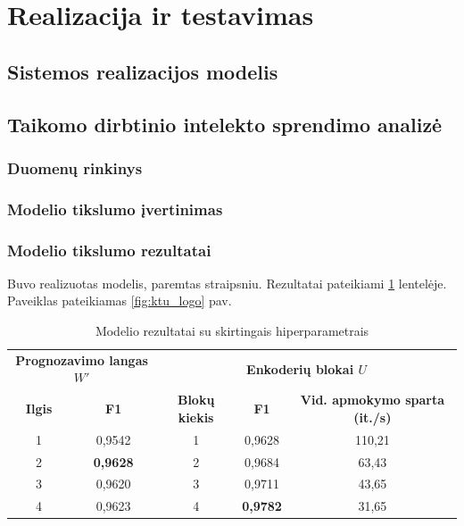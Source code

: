 \section{Realizacija ir testavimas}
\subsection{Sistemos realizacijos modelis}
\subsection{Taikomo dirbtinio intelekto sprendimo analizė}
\subsubsection{Duomenų rinkinys}
\subsubsection{Modelio tikslumo įvertinimas}
\subsubsection{Modelio tikslumo rezultatai}
Buvo realizuotas modelis, paremtas \cite{attpaper} straipsniu. Rezultatai pateikiami \ref{tab:findparam} lentelėje.
Paveiklas pateikiamas \ref{fig:ktu_logo} pav.
\begin{table}[H]
\caption{Modelio rezultatai su skirtingais hiperparametrais}
\centering
\begin{tabular}{ccccc}
\toprule
\multicolumn{2}{c}{\textbf{Prognozavimo langas $W'$}} & \multicolumn{3}{c}{\textbf{Enkoderių blokai $U$}} \\
\cmidrule(lr){1-2} \cmidrule(lr){3-5}
\textbf{Ilgis} & \textbf{F1} & \textbf{Blokų kiekis} & \textbf{F1} & \textbf{Vid. apmokymo sparta (it./s)} \\
\midrule
1 & 0,9542 & 1 & 0,9628 & 110,21\\
2 & \textbf{0,9628} & 2  & 0,9684 & 63,43 \\
3 & 0,9620 & 3  & 0,9711 & 43,65\\
4 & 0,9623 & 4  &\textbf{0,9782} & 31,65 \\
\bottomrule
\end{tabular}
\label{tab:findparam}
\end{table}

